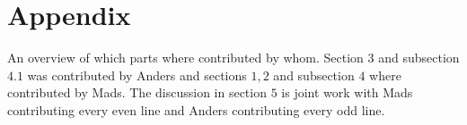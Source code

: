 \section*{Appendix}
\label{sec:appendix}

An overview of which parts where contributed by whom. Section $3$ and subsection $4.1$ was contributed by Anders and sections $1, 2$ and subsection $4$ where contributed by Mads. The discussion in section $5$ is joint work with Mads contributing every even line and Anders contributing every odd line. 